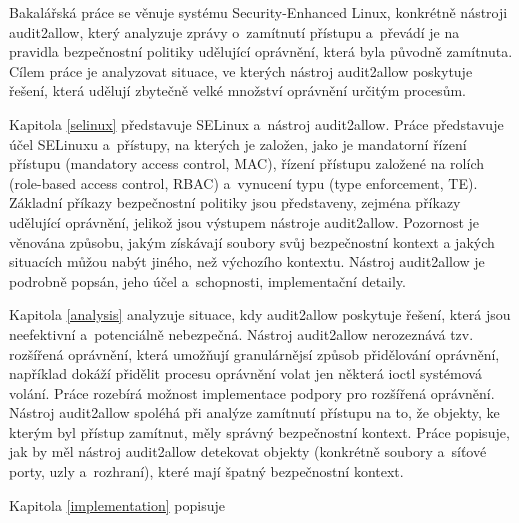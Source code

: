 Bakalářská práce se věnuje systému Security-Enhanced Linux, konkrétně nástroji
audit2allow, který analyzuje zprávy o~zamítnutí přístupu a~převádí je na
pravidla bezpečnostní politiky udělující oprávnění, která byla původně
zamítnuta. Cílem práce je analyzovat situace, ve kterých nástroj audit2allow
poskytuje řešení, která udělují zbytečně velké množství oprávnění určitým
procesům.

Kapitola \ref{selinux} představuje SELinux a~nástroj audit2allow. Práce
představuje účel SELinuxu a~přístupy, na kterých je založen, jako je mandatorní
řízení přístupu (mandatory access control, MAC), řízení přístupu založené na
rolích (role-based access control, RBAC) a~vynucení typu (type enforcement, TE).
Základní příkazy bezpečnostní politiky jsou představeny, zejména příkazy
udělující oprávnění, jelikož jsou výstupem nástroje audit2allow. Pozornost je
věnována způsobu, jakým získávají soubory svůj bezpečnostní kontext a jakých
situacích můžou nabýt jiného, než výchozího kontextu. Nástroj audit2allow je
podrobně popsán, jeho účel a~schopnosti, implementační detaily.

Kapitola \ref{analysis} analyzuje situace, kdy audit2allow poskytuje řešení,
která jsou neefektivní a~potenciálně nebezpečná. Nástroj audit2allow nerozeznává
tzv. rozšířená oprávnění, která umožňují granulárnějsí způsob přidělování
oprávnění, například dokáží přidělit procesu oprávnění volat jen některá ioctl
systémová volání. Práce rozebírá možnost implementace podpory pro rozšířená
oprávnění. Nástroj audit2allow spoléhá při analýze zamítnutí přístupu na to, že
objekty, ke kterým byl přístup zamítnut, měly správný bezpečnostní kontext.
Práce popisuje, jak by měl nástroj audit2allow detekovat objekty (konkrétně
soubory a~síťové porty, uzly a~rozhraní), které mají špatný bezpečnostní
kontext.

Kapitola \ref{implementation} popisuje 


